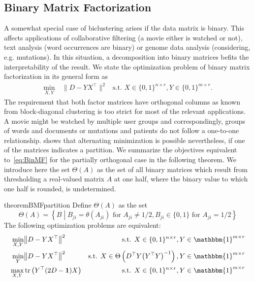 \subsection{Binary Matrix Factorization}\label{sec:ZS:BinaryMF}
A somewhat special case of biclustering arises if the data matrix is binary. This affects applications of collaborative filtering (a movie either is watched or not), text analysis (word occurrences are binary) or genome data analysis (considering, e.g. mutations). In this situation, a decomposition into binary matrices befits the interpretability of the result. We state the optimization problem of binary matrix factorization in its general form as
\begin{align}\label{eq:BinMF}
\min_{X,Y}\ &\bigl\lVert D-YX^\top\bigr\rVert ^2 & \text{s.t. } X\in\{0,1\}^{n\times r},Y\in\{0,1\}^{m\times r}. \tag{BiMF}
\end{align}
The requirement that both factor matrices have orthogonal columns as known from block-diagonal clustering is too strict for most of the relevant applications. A movie might be watched by multiple user groups and correspondingly, groups of words and documents or mutations and patients do not follow a one-to-one relationship. \cite{li2005general} shows that alternating minimization is possible nevertheless, if one of the matrices indicates a partition. We summarize the objectives equivalent to~\eqref{eq:BinMF} for the partially orthogonal case in the following theorem. We introduce here the set $\Theta(A)$ as the set of all binary matrices which result from thresholding a real-valued matrix $A$ at one half, where the binary value to which one half is rounded, is undetermined.
\begin{restatable}{theorem}{BMFpartition}\label{thm:BMFpartition}
Define $\Theta(A)$ as the set
\[\Theta(A) = \left\{B\middle\vert  B_{ji}=\theta(A_{ji}) \text{ for } A_{ji}\neq 1/2, B_{ji}\in\{0,1\} \text{ for } A_{ji}=1/2 \right\}\]
The following optimization problems are equivalent:
\begin{align}
    \label{eq:BinMF_YPartition}
    \min_{X,Y}& \bigl\lVert D-YX^\top\bigr\rVert ^2 & \text{s.t. } X\in\{0,1\}^{n\times r},Y\in\mathbbm{1}^{m\times r}\\
    \label{eq:BinMF_YPartitionThetaX}
    \min_{Y}& \bigl\lVert D-YX^\top\bigr\rVert ^2 & \text{s.t. } X\in\Theta\left(D^\top Y\bigl(Y^\top Y\bigr)^{-1}\right),Y\in\mathbbm{1}^{m\times r}\\
    \label{eq:BinMF_YPartititionTr}
    \max_{X,Y}& \tr\left(Y^\top (2D-\mathbf{1})X\right) & \text{s.t. } X\in\{0,1\}^{n\times r},Y\in\mathbbm{1}^{m\times r}
\end{align}
\end{restatable}
